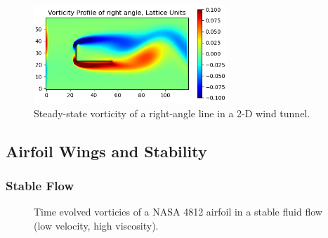 \documentclass[twoside]{article}
\begin{document}
\begin{centering}
\begin{figure}[H]
\centering
\graphicspath{ {stream_images/} }
\includegraphics[width=0.65\textwidth]{final_right_angle.png}
\captionsetup{format = hang, width = 0.8\textwidth}
\caption{Steady-state vorticity of a right-angle line in a 2-D wind tunnel.}
\label{fig:FinalRightAngle}
\end{figure}
\end{centering}

\hfill


\subsection{Airfoil Wings and Stability}
\subsubsection{Stable Flow}

\begin{centering}
\begin{figure}[H]
\centering
\graphicspath{ {stream_images/} }
\hfill
{}
\hfill
{}
\label{figs:StableAirfoil}
\captionsetup{format = hang, width = 0.8\textwidth}
\caption{Time evolved vorticies of a NASA 4812 airfoil in a stable fluid flow (low velocity, high viscosity).}
\end{figure}
\end{centering}
\end{document}
